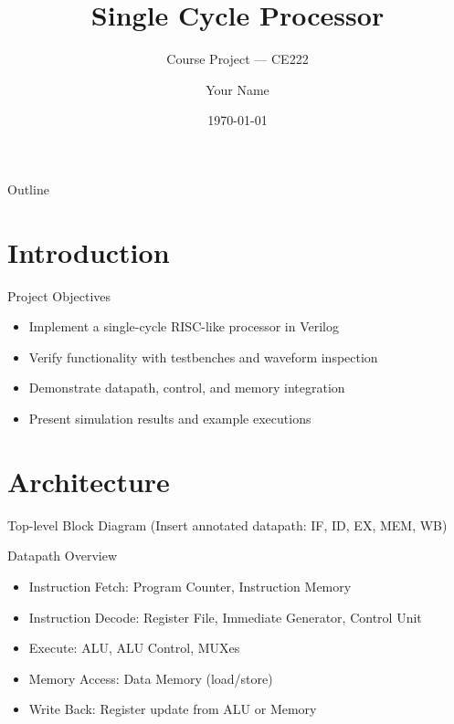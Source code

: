 \documentclass[aspectratio=169]{beamer}
\title{Single Cycle Processor}
\subtitle{Course Project — CE222}
\author{Your Name}
\date{\today}
\begin{document}
\begin{frame}
  \titlepage
\end{frame}

\begin{frame}{Outline}
  \tableofcontents
\end{frame}

\section{Introduction}
\begin{frame}{Project Objectives}
  \begin{itemize}
    \item Implement a single-cycle RISC-like processor in Verilog
    \item Verify functionality with testbenches and waveform inspection
    \item Demonstrate datapath, control, and memory integration
    \item Present simulation results and example executions
  \end{itemize}
\end{frame}

\section{Architecture}
\begin{frame}{Top-level Block Diagram}
  \centering
  \vspace{0.5em}
  {\small (Insert annotated datapath: IF, ID, EX, MEM, WB)}
\end{frame}

\begin{frame}{Datapath Overview}
  \begin{itemize}
    \item Instruction Fetch: Program Counter, Instruction Memory
    \item Instruction Decode: Register File, Immediate Generator, Control Unit
    \item Execute: ALU, ALU Control, MUXes
    \item Memory Access: Data Memory (load/store)
    \item Write Back: Register update from ALU or Memory
  \end{itemize}
\end{frame}
\end{document}
